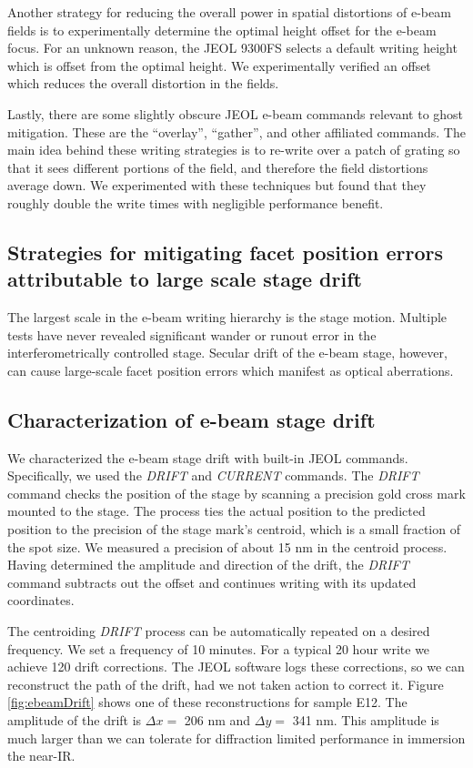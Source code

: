 Another strategy for reducing the overall power in spatial distortions of e-beam fields is to experimentally determine the optimal height offset for the e-beam focus.  For an unknown reason, the JEOL 9300FS selects a default writing height which is offset from the optimal height.  We experimentally verified an offset which reduces the overall distortion in the fields.

Lastly, there are some slightly obscure JEOL e-beam commands relevant to ghost mitigation.  These are the ``overlay'', ``gather'', and other affiliated commands.  The main idea behind these writing strategies is to re-write over a patch of grating so that it sees different portions of the field, and therefore the field distortions average down.  We experimented with these techniques but found that they roughly double the write times with negligible performance benefit.  


\subsection{Strategies for mitigating facet position errors attributable to large scale stage drift}

The largest scale in the e-beam writing hierarchy is the stage motion.  Multiple tests have never revealed significant wander or runout error in the interferometrically controlled stage.  Secular drift of the e-beam stage, however, can cause large-scale facet position errors which manifest as optical aberrations.

\subsection{Characterization of e-beam stage drift}
We characterized the e-beam stage drift with built-in JEOL commands.  Specifically, we used the \emph{DRIFT} and \emph{CURRENT} commands.  The \emph{DRIFT} command checks the position of the stage by scanning a precision gold cross mark mounted to the stage.  The process ties the actual position to the predicted position to the precision of the stage mark's centroid, which is a small fraction of the spot size.  We measured a precision of about 15 nm in the centroid process.  Having determined the amplitude and direction of the drift, the \emph{DRIFT} command subtracts out the offset and continues writing with its updated coordinates.

The centroiding \emph{DRIFT} process can be automatically repeated on a desired frequency.  We set a frequency of 10 minutes.  For a typical 20 hour write we achieve 120 drift corrections.  The JEOL software logs these corrections, so we can reconstruct the path of the drift, had we not taken action to correct it.  Figure \ref{fig:ebeamDrift} shows one of these reconstructions for sample E12.  The amplitude of the drift is  $\Delta x = $ 206 nm and $\Delta y = $ 341 nm.  This amplitude is much larger than we can tolerate for diffraction limited performance in immersion the near-IR.  

